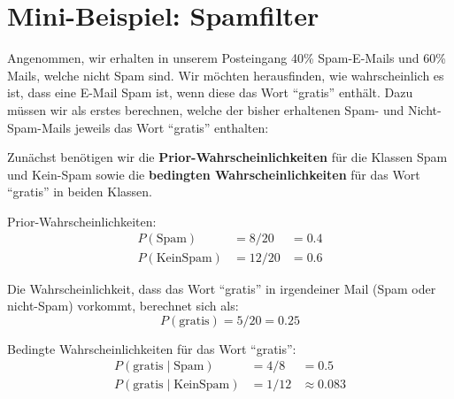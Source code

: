 \section{Mini-Beispiel: Spamfilter}

\begin{myexample}
    Angenommen, wir erhalten in unserem Posteingang 40\% Spam-E-Mails und 60\% Mails, welche nicht Spam sind. Wir möchten herausfinden, wie wahrscheinlich es ist, dass eine E-Mail Spam ist, wenn diese das Wort \enquote{gratis} enthält. Dazu müssen wir als erstes berechnen, welche der bisher erhaltenen Spam- und Nicht-Spam-Mails jeweils das Wort \enquote{gratis} enthalten:


    \begin{table}[H]
        \centering
    \end{table}



    Zunächst benötigen wir die \textbf{Prior-Wahrscheinlichkeiten} für die Klassen Spam und Kein-Spam sowie die \textbf{bedingten Wahrscheinlichkeiten} für das Wort \enquote{gratis} in beiden Klassen.

    Prior-Wahrscheinlichkeiten:
    \[
        \begin{aligned}
            P(\text{Spam})     & = 8/20  & = 0.4 \\
            P(\text{KeinSpam}) & = 12/20 & = 0.6
        \end{aligned}
    \]

    Die Wahrscheinlichkeit, dass das Wort \enquote{gratis} in irgendeiner Mail (Spam oder nicht-Spam) vorkommt, berechnet sich als:
    \[
        P(\text{gratis}) = 5/20 = 0.25
    \]


    Bedingte Wahrscheinlichkeiten für das Wort \enquote{gratis}:
    \[
        \begin{aligned}
            P(\text{gratis}\mid\text{Spam})     & = 4/8  & = 0.5         \\
            P(\text{gratis}\mid\text{KeinSpam}) & = 1/12 & \approx 0.083
        \end{aligned}
    \]


\end{myexample}
